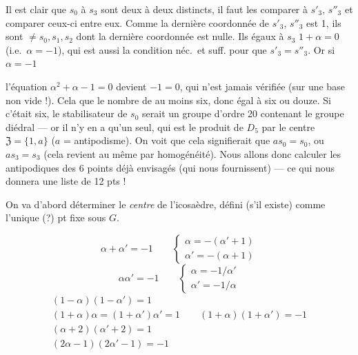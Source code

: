 \documentclass[11pt,a4paper]{article}
\begin{document}
\struck{\ill{}} Il est clair que $s_0$ à $s_3$ sont deux à deux distincts, il faut  les comparer à $s'_3$, $s''_3$ et comparer ceux-ci entre eux. Comme la dernière coordonnée de $s'_3$, $s''_3$ \struck{\ill{}} est 1, ils sont $\neq s_0, s_1, s_2$ dont la dernière coordonnée est nulle. Ils \struck{\ill{}}  égaux  à $s_3$ \struck{\ill{}}  $1 + \alpha = 0$ (i.e.\ $\alpha = -1$), qui est  aussi la condition néc.\ et suff. pour que $s'_3 = s''_3$. Or  \ill{} si $\alpha = -1$

l'équation $\alpha^2 + \alpha - 1 = 0$ devient $-1 = 0$, qui n'est jamais vérifiée (sur une base non vide !). Cela   que le nombre de \struck{\ill{}}  au moins six, donc égal à six ou douze. Si c'était  six, le stabilisateur de \struck{\ill{}} $s_0$ serait un groupe d'ordre 20 contenant le groupe diédral  --- or il n'y en a qu'un seul, qui est le produit de $D_5$ par le centre $\mathfrak{Z} = \{1, a\}$ ($a$ = antipodisme). On voit que cela signifierait que $a s_0 = s_0$, ou $a s_3 = s_3$ (cela revient au même par homogénéité). Nous allons donc calculer les antipodiques des 6 points déjà envisagés (qui nous fournissent) --- ce qui nous donnera une liste de 12 pts !

On va d'abord déterminer le \emph{centre} de l'icosaèdre, défini (s'il existe) comme l'unique (?) pt fixe sous $G$.

\[ \alpha + \alpha' = -1 \qquad \begin{cases} \alpha = -(\alpha' + 1) \\ \alpha' = -(\alpha + 1) \end{cases} \]
\[ \alpha\alpha' = -1 \qquad \begin{cases} \alpha = -1/\alpha' \\ \alpha' = -1/\alpha \end{cases} \]
\begin{gather*}
(1 - \alpha)(1 - \alpha') = 1 \\
(1 + \alpha)\alpha = (1 + \alpha')\alpha' = 1 \qquad (1 + \alpha)(1 + \alpha') = -1 \\
(\alpha + 2)(\alpha' + 2) = 1 \\
(2\alpha - 1)(2\alpha' - 1) = -1
\end{gather*}
\end{document}
